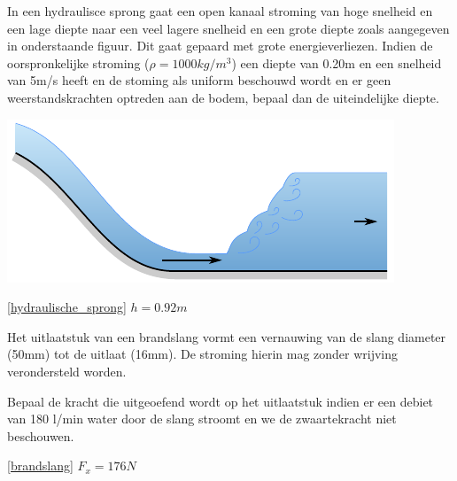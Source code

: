 \begin{toepassing}
	\label{hydraulische_sprong}
In een hydraulisce sprong gaat een open kanaal stroming van hoge snelheid en een lage diepte naar een veel lagere snelheid en een grote diepte zoals aangegeven in onderstaande figuur. Dit gaat gepaard met grote energieverliezen. Indien de oorspronkelijke stroming ($\rho=1000\unit{kg/m^3}$) een diepte van 0.20m en een snelheid van 5m/s heeft en de stoming als uniform beschouwd wordt en er geen weerstandskrachten optreden aan de bodem, bepaal dan de uiteindelijke diepte.

	\centering
	\includegraphics{fig/behoudsvergelijkingen/hydraulische_sprong}
\end{toepassing}
\begin{antwoord}{\ref{hydraulische_sprong}}
	$h = 0.92\unit{m}$
\end{antwoord}
\begin{toepassing}[*]
	\label{brandslang}
Het uitlaatstuk van een brandslang vormt een vernauwing van de slang diameter (50mm) tot de uitlaat (16mm). De stroming hierin mag zonder wrijving verondersteld worden.

Bepaal de kracht die uitgeoefend wordt op het uitlaatstuk indien er een debiet van 180 l/min water door de slang stroomt en we de zwaartekracht niet beschouwen.

	\centering
\end{toepassing}
\begin{antwoord}{\ref{brandslang}}
	$F_x = 176\unit{N}$
\end{antwoord}
